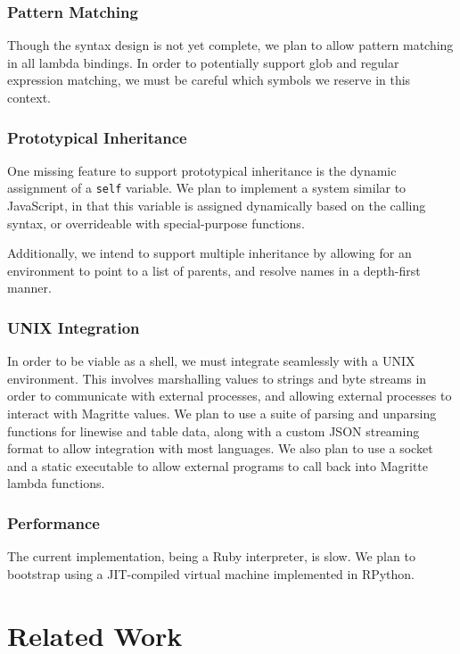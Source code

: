 \documentclass[english,preprint,JIP,uplatex]{ipsj}
\begin{document}
\subsubsection{Pattern Matching}\noindent
Though the syntax design is not yet complete, we plan to allow pattern matching in all lambda bindings. In order to potentially support glob and regular expression matching, we must be careful which symbols we reserve in this context.

\subsubsection{Prototypical Inheritance}\noindent
One missing feature to support prototypical inheritance is the dynamic assignment of a \verb/self/ variable. We plan to implement a system similar to JavaScript, in that this variable is assigned dynamically based on the calling syntax, or overrideable with special-purpose functions.

Additionally, we intend to support multiple inheritance by allowing for an environment to point to a list of parents, and resolve names in a depth-first manner.

\subsubsection{UNIX Integration}\noindent
In order to be viable as a shell, we must integrate seamlessly with a UNIX environment. This involves marshalling values to strings and byte streams in order to communicate with external processes, and allowing external processes to interact with Magritte values. We plan to use a suite of parsing and unparsing functions for linewise and table data, along with a custom JSON streaming format to allow integration with most languages. We also plan to use a socket and a static executable to allow external programs to call back into Magritte lambda functions.

\subsubsection{Performance}\noindent
The current implementation, being a Ruby interpreter, is slow. We plan to bootstrap using a JIT-compiled virtual machine implemented in RPython.

\section{Related Work}\label{related-work}
\end{document}
